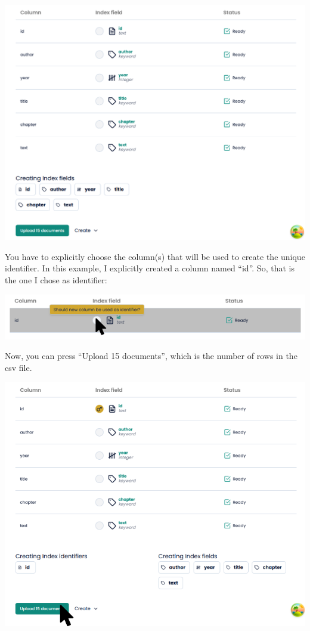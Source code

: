 \documentclass[
  letterpaper,
  DIV=11,
  numbers=noendperiod]{scrreprt}
\begin{document}
\includegraphics{media/amcat-3.1-8.png}

You have to explicitly choose the column(s) that will be used to create
the unique identifier. In this example, I explicitly created a column
named ``id''. So, that is the one I chose as identifier:

\includegraphics{media/amcat-3.1-9.png}

Now, you can press ``Upload 15 documents'', which is the number of rows
in the csv file.

\includegraphics{media/amcat-3.1-10.png}
\end{document}
